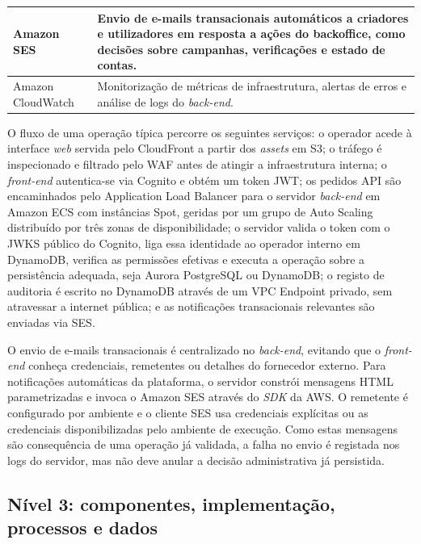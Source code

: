 \begin{table}[H]
\begin{center}
\begin{tabular}{|l|p{9cm}|}
Amazon SES            & Envio de e-mails transacionais automáticos a criadores e utilizadores em resposta a ações do backoffice, como decisões sobre campanhas, verificações e estado de contas. \\ \hline
Amazon CloudWatch     & Monitorização de métricas de infraestrutura, alertas de erros e análise de logs do \textit{back-end}. \\ \hline
\end{tabular}
\end{center}
\end{table}

O fluxo de uma operação típica percorre os seguintes serviços: o operador acede à interface \textit{web} servida pelo CloudFront a partir dos \textit{assets} em S3; o tráfego é inspecionado e filtrado pelo \gls{WAF} antes de atingir a infraestrutura interna; o \textit{front-end} autentica-se via Cognito e obtém um token JWT; os pedidos \gls{API} são encaminhados pelo Application Load Balancer para o servidor \textit{back-end} em Amazon ECS com instâncias Spot, geridas por um grupo de Auto Scaling distribuído por três zonas de disponibilidade; o servidor valida o token com o \gls{JWKS} público do Cognito, liga essa identidade ao operador interno em DynamoDB, verifica as permissões efetivas e executa a operação sobre a persistência adequada, seja Aurora PostgreSQL ou DynamoDB; o registo de auditoria é escrito no DynamoDB através de um VPC Endpoint privado, sem atravessar a internet pública; e as notificações transacionais relevantes são enviadas via SES.

O envio de e-mails transacionais é centralizado no \textit{back-end}, evitando que o \textit{front-end} conheça credenciais, remetentes ou detalhes do fornecedor externo. Para notificações automáticas da plataforma, o servidor constrói mensagens HTML parametrizadas e invoca o Amazon SES através do \textit{SDK} da AWS. O remetente é configurado por ambiente e o cliente SES usa credenciais explícitas ou as credenciais disponibilizadas pelo ambiente de execução. Como estas mensagens são consequência de uma operação já validada, a falha no envio é registada nos logs do servidor, mas não deve anular a decisão administrativa já persistida.

\subsection{Nível 3: componentes, implementação, processos e dados}

